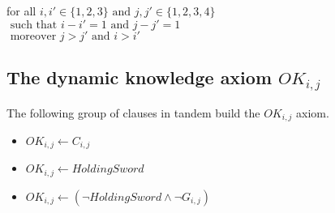 \documentclass{article}
\begin{document}
\begin{flushright}
	for all $i,i' \in \{1,2,3\} \text{ and } j,j' \in \{1,2,3,4\}$ \\  $\text{ such that } i-i' = 1 \text{ and } j-j' = 1$ \\ $\text{ moreover } j>j' \text{ and } i > i'$
\end{flushright}

\newpage
\subsection{The dynamic knowledge axiom $OK_{i,j}$}
The following group of clauses in tandem build the $OK_{i,j}$ axiom.
\begin{itemize}
	\item $OK_{i,j} \leftarrow C_{i,j}$
	\item $OK_{i,j} \leftarrow HoldingSword$
	\item $OK_{i,j} \leftarrow (\neg HoldingSword \land \neg G_{i,j})$
\end{itemize}
\end{document}
